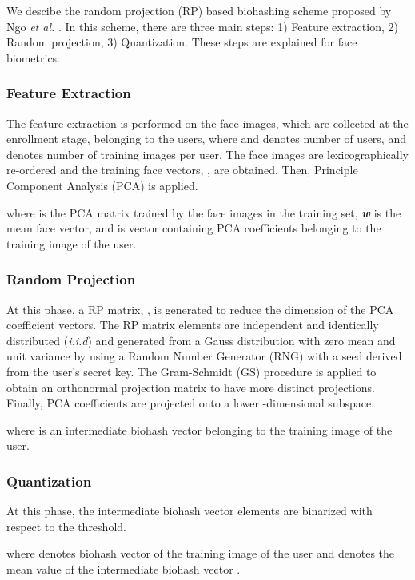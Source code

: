 \documentclass[journal]{IEEEtran}
\begin{document}
We descibe the random projection (RP) based biohashing scheme proposed by Ngo \textit{et al.} \cite{Ngo}. In this scheme, there are three main steps: 1) Feature extraction, 2) Random projection, 3) Quantization. These steps are explained for face biometrics.

\subsubsection{Feature Extraction}

The feature extraction is performed on the face images, which are collected at the enrollment stage, belonging to the users,  where  and  denotes number of users,  and  denotes number of training images per user. The face images are lexicographically re-ordered and the training face vectors, , are obtained. Then, Principle Component Analysis (PCA) \cite{Turk} is applied. 


where  is the PCA matrix trained by the face images in the training set, \textit{\textbf{w}} is the mean face vector, and  is vector containing PCA coefficients belonging to the  training image of the  user.

\subsubsection{Random Projection}

At this phase, a RP matrix, , is generated to reduce the dimension of the PCA coefficient vectors. The RP matrix elements are independent and identically distributed (\textit{i.i.d}) and generated from a Gauss distribution with zero mean and unit variance by using a Random Number Generator (RNG) with a seed derived from the user's secret key. The Gram-Schmidt (GS) procedure is applied to obtain an orthonormal projection matrix  to have more distinct projections. Finally, PCA coefficients are projected onto a lower -dimensional subspace.


where  is an intermediate biohash vector belonging to the  training image of the  user.

\subsubsection{Quantization}

At this phase, the intermediate biohash vector  elements are binarized with respect to the threshold.

 
where  denotes biohash vector of the  training image of the  user and  denotes the mean value of the intermediate biohash vector . 
\end{document}
